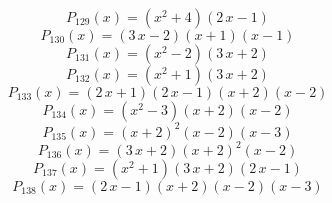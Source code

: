 \subitem \begin{dmath*}P_{129}(x) = {\left(x^{2} + 4\right)} {\left(2 \, x - 1\right)} \end{dmath*}\vspace{- 1.20000000000000 cm}
\subitem \begin{dmath*}P_{130}(x) = {\left(3 \, x - 2\right)} {\left(x + 1\right)} {\left(x - 1\right)} \end{dmath*}\vspace{- 1.20000000000000 cm}
\subitem \begin{dmath*}P_{131}(x) = {\left(x^{2} - 2\right)} {\left(3 \, x + 2\right)} \end{dmath*}\vspace{- 1.20000000000000 cm}
\subitem \begin{dmath*}P_{132}(x) = {\left(x^{2} + 1\right)} {\left(3 \, x + 2\right)} \end{dmath*}\vspace{- 1.20000000000000 cm}
\subitem \begin{dmath*}P_{133}(x) = {\left(2 \, x + 1\right)} {\left(2 \, x - 1\right)} {\left(x + 2\right)} {\left(x - 2\right)} \end{dmath*}\vspace{- 1.20000000000000 cm}
\subitem \begin{dmath*}P_{134}(x) = {\left(x^{2} - 3\right)} {\left(x + 2\right)} {\left(x - 2\right)} \end{dmath*}\vspace{- 1.20000000000000 cm}
\subitem \begin{dmath*}P_{135}(x) = {\left(x + 2\right)}^{2} {\left(x - 2\right)} {\left(x - 3\right)} \end{dmath*}\vspace{- 1.20000000000000 cm}
\subitem \begin{dmath*}P_{136}(x) = {\left(3 \, x + 2\right)} {\left(x + 2\right)}^{2} {\left(x - 2\right)} \end{dmath*}\vspace{- 1.20000000000000 cm}
\subitem \begin{dmath*}P_{137}(x) = {\left(x^{2} + 1\right)} {\left(3 \, x + 2\right)} {\left(2 \, x - 1\right)} \end{dmath*}\vspace{- 1.20000000000000 cm}
\subitem \begin{dmath*}P_{138}(x) = {\left(2 \, x - 1\right)} {\left(x + 2\right)} {\left(x - 2\right)} {\left(x - 3\right)} \end{dmath*}\vspace{- 1.20000000000000 cm}
